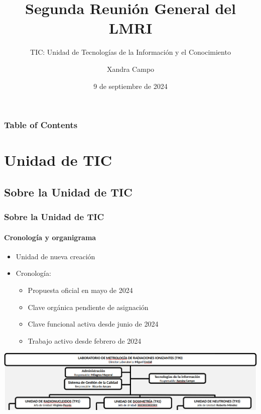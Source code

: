 \documentclass{beamer}
\title{Segunda Reunión General del LMRI}
\subtitle{TIC: Unidad de Tecnologías de la Información y el Conocimiento}
\author[X. Campo]{Xandra Campo}
\institute[LMRI-CIEMAT]{Laboratorio de Metrología de Radiaciones Ionizantes (LMRI) \newline CIEMAT}
\date{9 de septiembre de 2024}
\newcommand{\highlight}[1]{{\color{blue} #1}}
\begin{document}
	\maketitle

	\begin{frame}
		\frametitle{Table of Contents}
		\tableofcontents
	\end{frame}

	\section{Unidad de TIC}
	
	\subsection{Sobre la Unidad de TIC}
	
	\begin{frame}
		\frametitle{Sobre la Unidad de TIC}
		\framesubtitle{Cronología y organigrama}
		\begin{itemize}
			\item Unidad de \highlight{nueva creación}
			\item \highlight{Cronología}:
			\begin{itemize}
				\item Propuesta oficial en mayo de 2024
				\item Clave orgánica pendiente de asignación
				\item Clave funcional activa desde junio de 2024
				\item Trabajo activo desde febrero de 2024
			\end{itemize}
		\end{itemize}
		\bigskip
		\includegraphics[width=\textwidth]{organigrama}
	\end{frame}
	
\end{document}
